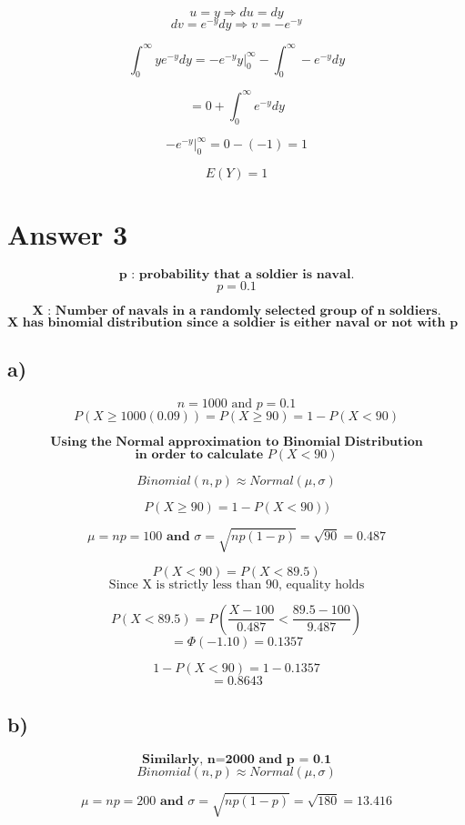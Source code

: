 \documentclass[12pt]{article}
\begin{document}
\[ u = y \Longrightarrow  du = dy \]
\[ dv = e^{-y}dy \Longrightarrow  v = -e^{-y} \]

\[\int_{0}^{\infty} ye^{-y} dy = -e^{-y}y \big|_0^{\infty} - 
\int_0^{\infty} -e^{-y} dy \]

\[ = 0 + \int_0^{\infty} e^{-y}dy \]

\[-e^{-y} \big|_0^{\infty} = 0 - (-1) = 1\]

\[E(Y) = 1\]

\section*{Answer 3}

\[\textbf{p : probability that a soldier is naval.}\]
\[p = 0.1\]

\[\textbf{X : Number of navals in a randomly selected group of n soldiers.}\]
\[\textbf{X has binomial distribution since a soldier is either naval or not with p = 0.1 and n }\]


\subsection*{a)} 

\[ n = 1000 \text{ and } p = 0.1\]
\[ P(X \geq 1000(0.09) ) = P(X \geq 90 ) = 1 - P( X < 90) \]

\[\textbf{Using the Normal approximation to Binomial Distribution}\]
\[ \textbf{in order to calculate } P(X < 90)\]

\[ Binomial(n,p) \approx Normal(\mu,\sigma)\]

\[ P(X \geq 90) = 1 - P(X < 90))\]

\[ \mu = np = 100 \textbf{ and } \sigma = \sqrt{np(1-p)} = \sqrt{90} = 0.487\]

\[P(X<90) = P(X<89.5) \]
\[\text{Since X is strictly less than 90, equality holds}\]


\[P(X<89.5) = P(\frac{X-100}{0.487} < \frac{89.5-100}{9.487}) \]
\[ = \Phi(-1.10) = 0.1357\]

\[ 1 - P(X<90) = 1 - 0.1357 \]
\[= 0.8643 \]



\subsection*{b)} 
\[\textbf{Similarly, n=2000 and p = 0.1}\]
\[ Binomial(n,p) \approx Normal(\mu,\sigma)\]

\[ \mu = np = 200 \textbf{ and } \sigma = \sqrt{np(1-p)} = \sqrt{180} = 13.416\]
\end{document}
